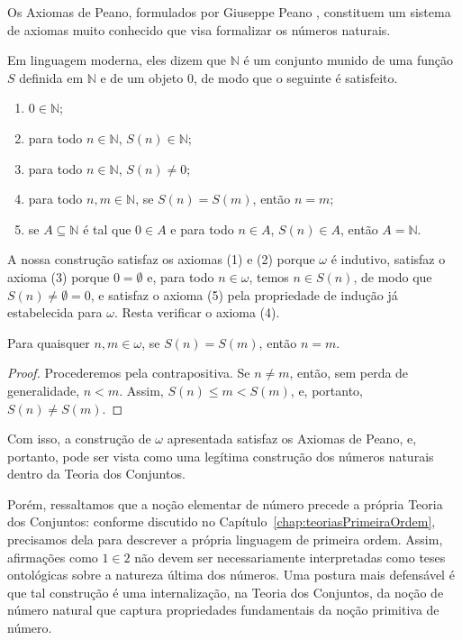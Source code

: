 Os Axiomas de Peano, formulados por Giuseppe Peano \cite{peano1889arithmetices}, constituem um sistema de axiomas muito conhecido que visa formalizar os números naturais.

Em linguagem moderna, eles dizem que $\mathbb N$ é um conjunto munido de uma função $S$ definida em $\mathbb N$ e de um objeto $0$, de modo que o seguinte é satisfeito.
\begin{enumerate}[label=(\arabic*)]
    \item $0\in \mathbb N$;
    \item para todo $n \in \mathbb N$, $S(n)\in \mathbb N$;
    \item para todo $n \in \mathbb N$, $S(n)\neq 0$;
    \item para todo $n, m \in \mathbb N$, se $S(n) = S(m)$, então $n = m$;
    \item se $A\subseteq \mathbb N$ é tal que $0\in A$ e para todo $n \in A$, $S(n)\in A$, então $A=\mathbb N$.
\end{enumerate}

A nossa construção satisfaz os axiomas (1) e (2) porque $\omega$ é indutivo, satisfaz o axioma (3) porque $0=\emptyset$ e, para todo $n \in \omega$, temos $n\in S(n)$, de modo que $S(n)\neq \emptyset=0$, e satisfaz o axioma (5) pela propriedade de indução já estabelecida para $\omega$.
Resta verificar o axioma (4).

\begin{proposition}[$Z^--P$]\label{prop:injetividadeDoSucessorNosNaturais}
    Para quaisquer $n, m \in \omega$, se $S(n) = S(m)$, então $n = m$.
\end{proposition}
\begin{proof}
    Procederemos pela contrapositiva.
    Se $n\neq m$, então, sem perda de generalidade, $n<m$.
    Assim, $S(n)\leq m<S(m)$, e, portanto, $S(n)\neq S(m)$.
\end{proof}

Com isso, a construção de $\omega$ apresentada satisfaz os Axiomas de Peano, e, portanto, pode ser vista como uma legítima construção dos números naturais dentro da Teoria dos Conjuntos.

Porém, ressaltamos que a noção elementar de número precede a própria Teoria dos Conjuntos: conforme discutido no Capítulo~\ref{chap:teoriasPrimeiraOrdem}, precisamos dela para descrever a própria linguagem de primeira ordem.
Assim, afirmações como $1\in 2$ não devem ser necessariamente interpretadas como teses ontológicas sobre a natureza última dos números.
Uma postura mais defensável é que tal construção é uma internalização, na Teoria dos Conjuntos, da noção de número natural que captura propriedades fundamentais da noção primitiva de número.
